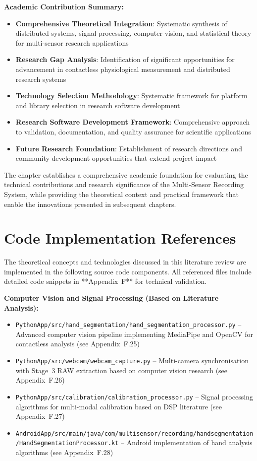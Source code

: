 \documentclass[11pt,a4paper]{report}
\begin{document}
\noindent \textbf{Academic Contribution Summary:}
\begin{itemize}
\item \textbf{Comprehensive Theoretical Integration}: Systematic synthesis of distributed systems, signal processing, computer vision, and statistical theory for multi-sensor research applications
\item \textbf{Research Gap Analysis}: Identification of significant opportunities for advancement in contactless physiological measurement and distributed research systems
\item \textbf{Technology Selection Methodology}: Systematic framework for platform and library selection in research software development
\item \textbf{Research Software Development Framework}: Comprehensive approach to validation, documentation, and quality assurance for scientific applications
\item \textbf{Future Research Foundation}: Establishment of research directions and community development opportunities that extend project impact
\end{itemize}

The chapter establishes a comprehensive academic foundation for evaluating the technical contributions and research significance of the Multi-Sensor Recording System, while providing the theoretical context and practical framework that enable the innovations presented in subsequent chapters.

\section{Code Implementation References}

The theoretical concepts and technologies discussed in this literature review are implemented in the following source code components. All referenced files include detailed code snippets in **Appendix~F** for technical validation.

\noindent \textbf{Computer Vision and Signal Processing (Based on Literature Analysis):}\\
\begin{itemize}
\item \texttt{PythonApp/src/hand\_segmentation/hand\_segmentation\_processor.py} – Advanced computer vision pipeline implementing MediaPipe and OpenCV for contactless analysis (see Appendix~F.25)
\item \texttt{PythonApp/src/webcam/webcam\_capture.py} – Multi-camera synchronisation with Stage~3 RAW extraction based on computer vision research (see Appendix~F.26)
\item \texttt{PythonApp/src/calibration/calibration\_processor.py} – Signal processing algorithms for multi-modal calibration based on DSP literature (see Appendix~F.27)
\item \texttt{AndroidApp/src/main/java/com/multisensor/recording/handsegmentation/HandSegmentationProcessor.kt} – Android implementation of hand analysis algorithms (see Appendix~F.28)
\end{itemize}
\end{document}
